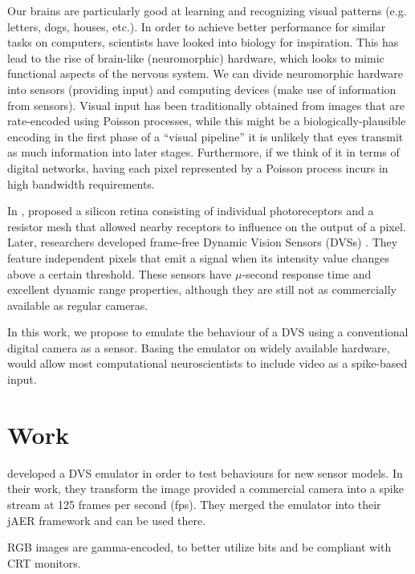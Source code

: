 \documentclass[]{article}
\begin{document}
Our brains are particularly good at learning and recognizing visual patterns (e.g. letters, dogs, houses, etc.). In order to achieve better performance for similar tasks on computers, scientists have looked into biology for inspiration. This has lead to the rise of brain-like (neuromorphic) hardware, which looks to mimic functional aspects of the nervous system. We can divide neuromorphic hardware into sensors (providing input) and computing devices (make use of information from sensors). Visual input has been traditionally obtained from images that are rate-encoded using Poisson processes, while this might be a biologically-plausible encoding in the first phase of a ``visual pipeline'' it is unlikely that eyes transmit as much information into later stages. Furthermore, if we think of it in terms of digital networks, having each pixel represented by a Poisson process incurs in high bandwidth requirements. 

In \citeyear{Mead1989}, \citeauthor{Mead1989} proposed a silicon retina consisting of individual photoreceptors and a resistor mesh that allowed nearby receptors to influence on the output of a pixel\cite{Mead1989}. 
Later, researchers developed frame-free Dynamic Vision Sensors (DVSs) \cite{delbruck_dvs,bernabe_dvs}. They feature independent pixels that emit a signal when its intensity value changes above a certain threshold. These sensors have $\mu$-second response time and excellent dynamic range properties, although they are still not as commercially available as regular cameras.

In this work, we propose to emulate the behaviour of a DVS using a conventional digital camera as a sensor. Basing the emulator on widely available hardware, would allow most computational neuroscientists to include video as a spike-based input.



\section{Work}

\citeauthor{dvs_emu} developed a DVS emulator in order to test behaviours for new sensor models. In their work, they transform the image provided a commercial camera into a spike stream at 125 frames per second (fps). They merged the emulator into their jAER framework and can be used there.

RGB images are gamma-encoded, to better utilize bits and be compliant with CRT monitors.
\end{document}
